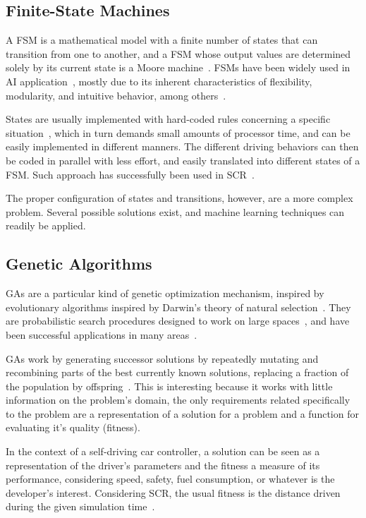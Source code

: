 \subsection{Finite-State Machines}%
A FSM is a mathematical model with a finite number of states that can transition from one to another, and a FSM whose output values are determined solely by its current state is a Moore machine~\cite{Ajzerman}. FSMs have been widely used in AI application~\cite{Millington:2006:FSM}, mostly due to its inherent characteristics of flexibility, modularity, and intuitive behavior, among others~\cite{Buckland:2005:AI}.

States are usually implemented with hard-coded rules concerning a specific situation~\cite{Buckland:2005:AI}, which in turn demands small amounts of processor time, and can be easily implemented in different manners. The different driving behaviors can then be coded in parallel with less effort, and easily translated into different states of a FSM. Such approach has successfully been used in SCR~\cite{2009,DIEGO}.

The proper configuration of states and transitions, however, are a more complex problem. Several possible solutions exist, and machine learning techniques can readily be applied.

\subsection{Genetic Algorithms}

GAs are a particular kind of genetic optimization mechanism, inspired by evolutionary algorithms inspired by Darwin's theory of natural selection~\cite{GA}. They are probabilistic search procedures designed to work on large spaces~\cite{goldberg1988}, and have been successful applications in many areas~\cite{GABIO,GAECO,stanley_real-time_2005,pedrycz_genetic_2005}.

GAs work by generating successor solutions by repeatedly mutating and recombining parts of the best currently known solutions, replacing a fraction of the population by offspring~\cite{mitchell_1997}. This is interesting because it works with little information on the problem's domain, the only requirements related specifically to the problem are a representation of a solution for a problem and a function for evaluating it's quality (fitness).

In the context of a self-driving car controller, a solution can be seen as a representation of the driver's parameters and the fitness a measure of its performance, considering speed, safety, fuel consumption, or whatever is the developer's interest. Considering SCR, the usual fitness is the distance driven during the given simulation time~\cite{2009}.
